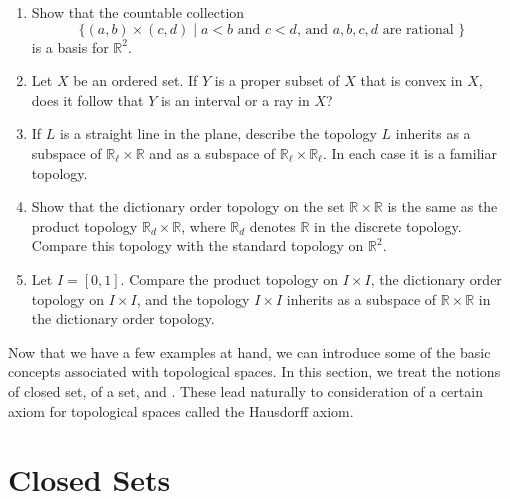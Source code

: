 \begin{enumerate}[itemsep=0.4em, parsep=0pt, topsep=0pt, partopsep=0pt, leftmargin=*, label=\arabic*., ref=\arabic*]
  \begin{enumerate}[itemsep=0.2em, parsep=0pt, topsep=0pt, partopsep=0pt, leftmargin=*, label=(\alph*), align=left]
  \item Show that if \(\mathcal{T}^{\prime } \supset \mathcal{T}\) and \(\mathcal{U}^{\prime } \supset \mathcal{U}\), then the product topology on \(X^{\prime } \times {Y}^{\prime }\) is finer than the product topology on \(X \times Y\).
  \item Does the converse of (a) hold? Justify your answer.
  \end{enumerate}
\item Show that the countable collection \[ \{ ( {a,b}) \times ( {c,d}) \mid a < b\text{ and }c < d\text{, and }a,b,c,d\text{ are rational }\} \] is a basis for \(\mathbb{R}^{2}\).
\item Let \(X\) be an ordered set. If \(Y\) is a proper subset of \(X\) that is convex in \(X\), does it follow that \(Y\) is an interval or a ray in \({X}\)?
\item If \(L\) is a straight line in the plane, describe the topology \(L\) inherits as a subspace of \(\mathbb{R}_{\ell } \times \mathbb{R}\) and as a subspace of \(\mathbb{R}_{\ell } \times {\mathbb{R}}_{\ell }\). In each case it is a familiar topology.
\item Show that the dictionary order topology on the set \(\mathbb{R} \times \mathbb{R}\) is the same as the product topology \(\mathbb{R}_{d} \times \mathbb{R}\), where \(\mathbb{R}_{d}\) denotes \(\mathbb{R}\) in the discrete topology. Compare this topology with the standard topology on \(\mathbb{R}^{2}\).
\item Let \(I = [ {0,1}]\). Compare the product topology on \(I \times I\), the dictionary order topology on \(I \times I\), and the topology \(I \times I\) inherits as a subspace of \(\mathbb{R} \times \mathbb{R}\) in the dictionary order topology.
\end{enumerate}


Now that we have a few examples at hand, we can introduce some of the basic concepts associated with topological spaces. In this section, we treat the notions of closed set,  of a set, and . These lead naturally to consideration of a certain axiom for topological spaces called the Hausdorff axiom.

\section*{Closed Sets}

